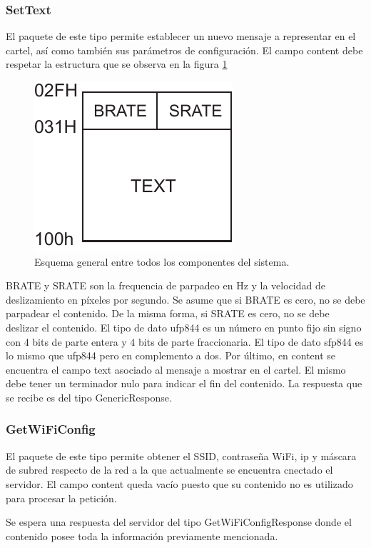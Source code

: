 \subsubsection{SetText}

El paquete de este tipo permite establecer un nuevo mensaje a representar en el cartel, así como también sus parámetros de configuración.
El campo content debe respetar la estructura que se observa en la figura \ref{fig:paquete-anim}


\begin{figure}[!ht]
	\centering
	\includegraphics[width=0.3\linewidth]{imagenes/protocolo/paquete-anim.pdf}
	\caption{Esquema general entre todos los componentes del sistema.}
	\label{fig:paquete-anim}
\end{figure}

BRATE y SRATE son la frequencia de parpadeo en Hz y la velocidad de deslizamiento en píxeles por segundo.
Se asume que si BRATE es cero, no se debe parpadear el contenido.
De la misma forma, si SRATE es cero, no se debe deslizar el contenido.
El tipo de dato ufp844 es un número en punto fijo sin signo con 4 bits de parte entera y 4 bits de parte fraccionaria.
El tipo de dato sfp844 es lo mismo que ufp844 pero en complemento a dos.
Por último, en content se encuentra el campo text asociado al mensaje a mostrar en el cartel.
El mismo debe tener un terminador nulo para indicar el fin del contenido.
La respuesta que se recibe es del tipo GenericResponse.



\subsubsection{GetWiFiConfig}

El paquete de este tipo permite obtener el SSID, contraseña WiFi, ip y máscara de subred respecto de la red a la que actualmente se encuentra cnectado el servidor.
El campo content queda vacío puesto que su contenido no es utilizado para procesar la petición.

Se espera una respuesta del servidor del tipo GetWiFiConfigResponse donde el contenido posee toda la información previamente mencionada.




